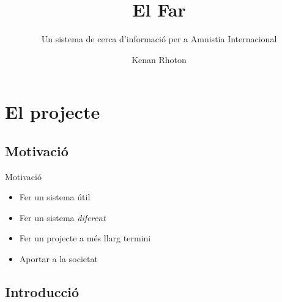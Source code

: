 \documentclass{beamer}
\title{El Far}
\subtitle{Un sistema de cerca d'informació per a Amnistia Internacional}
\author{Kenan Rhoton}
\institute[Facultat Informàtica de Barcelona --- UPC] %
\date{}
\begin{document}
\begin{frame}
    \titlepage{}
\end{frame}

\begin{frame}{}
    \begin{multicols}{2}
        \tableofcontents
    \end{multicols}
\end{frame}

\section{El projecte}

\subsection{Motivació}

\begin{frame}{Motivació}
    \begin{itemize}
        \item Fer un sistema útil
        \pause{}
        \item Fer un sistema \emph{diferent}
        \pause{}
        \item Fer un projecte a més llarg termini
        \pause{}
        \item Aportar a la societat
    \end{itemize}
\end{frame}

\subsection{Introducció}
\end{document}
